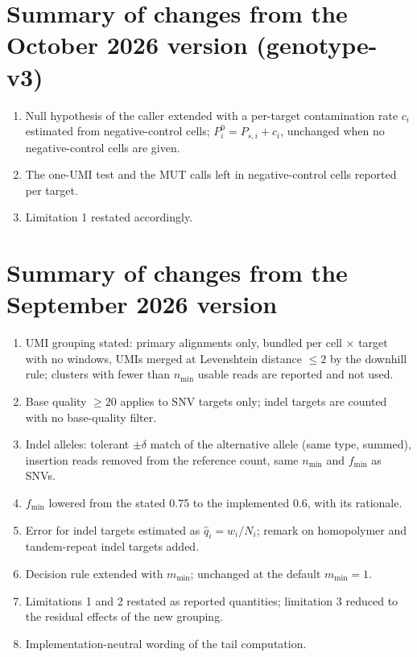 \documentclass[11pt]{article}
\begin{document}
\section*{Summary of changes from the October 2026 version (genotype-v3)}
\begin{enumerate}
\item Null hypothesis of the caller extended with a per-target contamination rate $c_i$ estimated from negative-control cells; $P^{0}_i = P_{s,i} + c_i$, unchanged when no negative-control cells are given.
\item The one-UMI test and the MUT calls left in negative-control cells reported per target.
\item Limitation 1 restated accordingly.
\end{enumerate}

\section*{Summary of changes from the September 2026 version}
\begin{enumerate}
\item UMI grouping stated: primary alignments only, bundled per cell $\times$ target with no windows, UMIs merged at Levenshtein distance $\leq 2$ by the downhill rule; clusters with fewer than $n_{\min}$ usable reads are reported and not used.
\item Base quality $\geq 20$ applies to SNV targets only; indel targets are counted with no base-quality filter.
\item Indel alleles: tolerant $\pm \delta$ match of the alternative allele (same type, summed), insertion reads removed from the reference count, same $n_{\min}$ and $f_{\min}$ as SNVs.
\item $f_{\min}$ lowered from the stated 0.75 to the implemented 0.6, with its rationale.
\item Error for indel targets estimated as $\hat q_i = w_i/N_i$; remark on homopolymer and tandem-repeat indel targets added.
\item Decision rule extended with $m_{\min}$; unchanged at the default $m_{\min}=1$.
\item Limitations 1 and 2 restated as reported quantities; limitation 3 reduced to the residual effects of the new grouping.
\item Implementation-neutral wording of the tail computation.
\end{enumerate}
\end{document}
